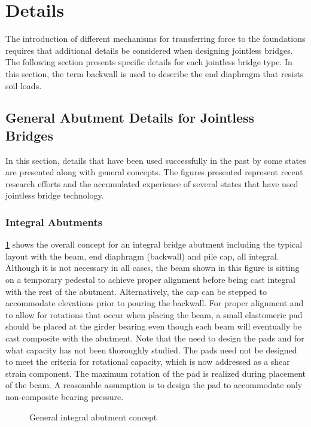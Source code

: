 \section{Details}
The introduction of different mechanisms for transferring force to the foundations requires that additional details
be considered when designing jointless bridges. The following section presents specific details for each jointless
bridge type. In this section, the term backwall is used to describe the end diaphragm that resists soil loads.

\subsection{General Abutment Details for Jointless Bridges}
In this section, details that have been used successfully in the past by some states are presented along with general
concepts. The figures presented represent recent research efforts and the accumulated experience of several states that
have used jointless bridge technology.

\subsubsection{Integral Abutments}
\label{subsubsec:integral-abutments}
\cref{fig:general-integral-abutment-concept} shows the overall concept for an integral bridge abutment including the typical layout with the beam,
end diaphragm (backwall) and pile cap, all integral. Although it is not necessary in all cases, the beam shown in this
figure is sitting on a temporary pedestal to achieve proper alignment before being cast integral with the rest of the
abutment. Alternatively, the cap can be stepped to accommodate elevations prior to pouring the backwall. For proper alignment and to allow for rotations that occur when placing the beam, a small elastomeric pad should be placed at the
girder bearing even though each beam will eventually be cast composite with the abutment. Note that the need to
design the pads and for what capacity has not been thoroughly studied. The pads need not be designed to meet the
criteria for rotational capacity, which is now addressed as a shear strain component. The maximum rotation of the
pad is realized during placement of the beam. A reasonable assumption is to design the pad to accommodate only
non-composite bearing pressure.

\begin{figure}
  \caption{General integral abutment concept}
  \label{fig:general-integral-abutment-concept}
\end{figure}

